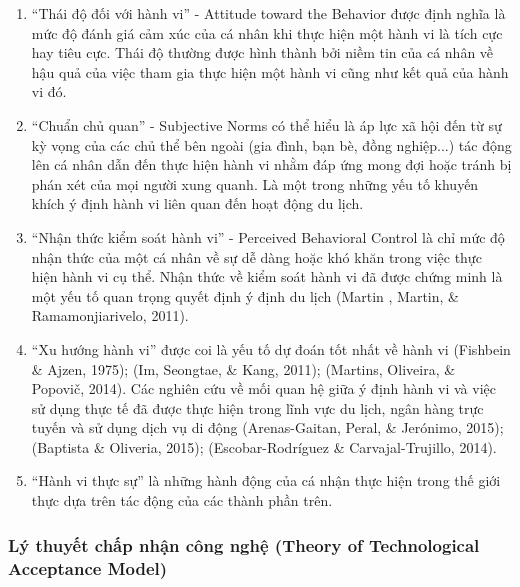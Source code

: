 		\begin{enumerate}[label= (\arabic*)]
			\item “Thái độ đối với hành vi” - Attitude toward the Behavior được định nghĩa là mức độ đánh giá cảm xúc của cá nhân khi thực hiện một hành vi là tích cực hay tiêu cực. Thái độ thường được hình thành bởi niềm tin của cá nhân về hậu quả của việc tham gia thực hiện một hành vi cũng như kết quả của hành vi đó. 
			\item “Chuẩn chủ quan” - Subjective Norms có thể hiểu là áp lực xã hội đến từ sự kỳ vọng của các chủ thể bên ngoài (gia đình, bạn bè, đồng nghiệp...) tác động lên cá nhân dẫn đến thực hiện hành vi nhằm đáp ứng mong đợi hoặc tránh bị phán xét của mọi người xung quanh. Là một trong những yếu tố khuyến khích ý định hành vi liên quan đến hoạt động du lịch.
			\item “Nhận thức kiểm soát hành vi” - Perceived Behavioral Control là chỉ mức độ nhận thức của một cá nhân về sự dễ dàng hoặc khó khăn trong việc thực hiện hành vi cụ thể. Nhận thức về kiểm soát hành vi đã được chứng minh là một yếu tố quan trọng quyết định ý định du lịch (Martin , Martin, \& Ramamonjiarivelo, 2011).
			\item “Xu hướng hành vi” được coi là yếu tố dự đoán tốt nhất về hành vi (Fishbein \& Ajzen, 1975); (Im, Seongtae, \& Kang, 2011); (Martins, Oliveira, \& Popovič, 2014). Các nghiên cứu về mối quan hệ giữa ý định hành vi và việc sử dụng thực tế đã được thực hiện trong lĩnh vực du lịch, ngân hàng trực tuyến và sử dụng dịch vụ di động (Arenas-Gaitan, Peral, \& Jerónimo, 2015); (Baptista \& Oliveria, 2015); (Escobar-Rodríguez \& Carvajal-Trujillo, 2014).
			\item “Hành vi thực sự” là những hành động của cá nhận thực hiện trong thế giới thực dựa trên tác động của các thành phần trên.
			
		\end{enumerate}
		
		\subsubsection{Lý thuyết chấp nhận công nghệ (Theory of Technological Acceptance Model)}
		
